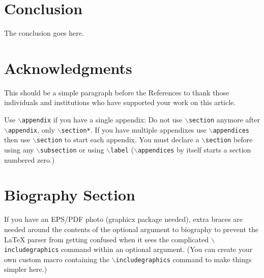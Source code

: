 \documentclass[lettersize,journal]{IEEEtran}
\begin{document}
\section{Conclusion}
The conclusion goes here.


\section*{Acknowledgments}
This should be a simple paragraph before the References to thank those individuals and institutions who have supported your work on this article.



{
Use $\backslash${\tt{appendix}} if you have a single appendix:
Do not use $\backslash${\tt{section}} anymore after $\backslash${\tt{appendix}}, only $\backslash${\tt{section*}}.
If you have multiple appendixes use $\backslash${\tt{appendices}} then use $\backslash${\tt{section}} to start each appendix.
You must declare a $\backslash${\tt{section}} before using any $\backslash${\tt{subsection}} or using $\backslash${\tt{label}} ($\backslash${\tt{appendices}} by itself
 starts a section numbered zero.)}




\printbibliography


\newpage

\section{Biography Section}
If you have an EPS/PDF photo (graphicx package needed), extra braces are
 needed around the contents of the optional argument to biography to prevent
 the LaTeX parser from getting confused when it sees the complicated
 $\backslash${\tt{includegraphics}} command within an optional argument. (You can create
 your own custom macro containing the $\backslash${\tt{includegraphics}} command to make things
 simpler here.)
 
\end{document}
